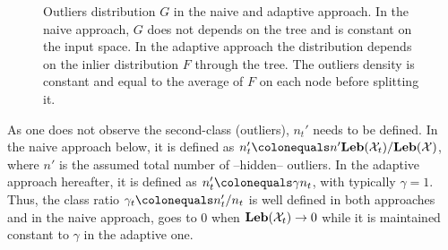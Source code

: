 \begin{figure}[!ht]
{}
  \caption[Outliers distribution $G$ in the naive and adaptive approach.
  ]{Outliers distribution $G$ in the naive and adaptive approach.  In the naive
  approach, $G$ does not depends on the tree and is constant on the input
  space. In the adaptive approach the distribution depends on the inlier
  distribution $F$ through the tree. The outliers density is constant and equal
  to the average of $F$ on each node before splitting it.
  \label{ocrf:fig:outlier_density}}
\end{figure}
%
%
As one does not observe the second-class (outliers), $n_t'$ needs to be
defined. In the naive approach below, it is defined as $n_t'\colonequals n'
\Leb(\mathcal{X}_t) / \Leb(\mathcal{X})$, where $n'$ is the assumed total
number of --hidden-- outliers.
%
In the adaptive approach hereafter, it is defined as $n_t' \colonequals \gamma
n_t$, with typically $\gamma=1$. Thus, the class ratio $\gamma_t \colonequals
n_t'/n_t$ is well defined in both approaches and in the naive approach, goes to
$0$ when $\mathbf{Leb}(\mathcal{X}_t) \to 0$ while it is maintained constant 
to $\gamma$ in the adaptive one.

